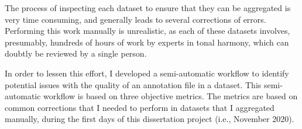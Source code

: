 


The process of inspecting each dataset to ensure that they
can be aggregated is very time consuming, and generally
leads to several corrections of errors. Performing this work
manually is unrealistic, as each of these datasets involves,
presumably, hundreds of hours of work by experts in tonal
harmony, which can doubtly be reviewed by a single person.

In order to lessen this effort, I developed a semi-automatic
workflow to identify potential issues with the quality of an
annotation file in a dataset. This semi-automatic workflow
is based on three objective metrics. The metrics are based
on common corrections that I needed to perform in datasets
that I aggregated manually, during the first days of this
dissertation project (i.e., November 2020).
